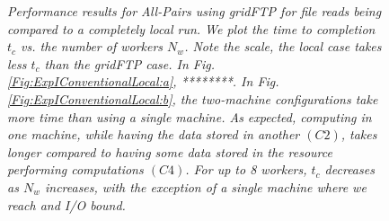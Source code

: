 \documentclass{rspublic}
\begin{document}
\begin{figure}[!ht]
\begin{center}
\caption{\textit{Performance results for All-Pairs using gridFTP for
file reads being compared to a completely local run. We plot the time to completion $t_c$ vs. the number of workers $N_w$. Note the scale, the local case takes less $t_c$  than the gridFTP case. In Fig. \ref{Fig:ExpIConventionalLocal:a}, ********. In Fig. \ref{Fig:ExpIConventionalLocal:b}, the
two-machine configurations take more time than using a single machine. As expected, computing in one machine, while having the data stored in another $(C2)$, takes longer compared to having some data stored in the resource performing computations $(C4)$. For up to 8 workers, $t_c$ decreases as $N_w$ increases, with the exception of a single machine where we reach and I/O bound.}}
\label{Fig:ExpIConventionalLocal}
\end{center}
\end{figure}
\end{document}
